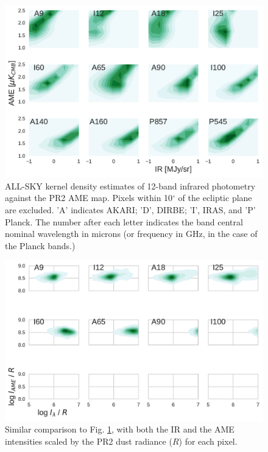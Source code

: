      \begin{figure}
        \label{fig:AMEvsDust_allsky_allbands}
        \includegraphics[width=150mm]{../Plots/AMEvsDust_allsky_allbands.pdf}
        \centering
        \caption{ALL-SKY kernel density estimates of 12-band infrared photometry against the PR2 AME map. Pixels within 10$^{\circ}$ of the ecliptic plane are excluded. 'A' indicates AKARI; 'D', DIRBE; 'I', IRAS, and 'P' Planck. The number after each letter indicates the band central nominal wavelength in microns (or frequency in GHz, in the case of the Planck bands.) }
      \end{figure}

      \begin{figure}
        \label{fig:AMEtoRvsDusttoR_allsky_allbands}
        \includegraphics[width=150mm]{../Plots/AMEvsDust_allsky_allbands__mpsub_Rnorm_kde.pdf}
        \centering
        \caption{Similar comparison to Fig. \ref{fig:AMEvsDust_allsky_allbands}, with both the IR and the AME intensities scaled by the PR2 dust radiance ($R$) for each pixel. }
      \end{figure}

